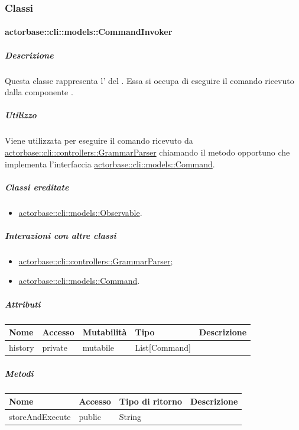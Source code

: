 \documentclass{scalatekids-article}
\begin{document}
\subsubsection{Classi}

\paragraph{actorbase::cli::models::CommandInvoker}
\label{sec:actorbase::cli::models::CommandInvoker}

\subparagraph{Descrizione}

Questa classe rappresenta l' del . Essa
si occupa di eseguire il comando ricevuto dalla componente .

\subparagraph{Utilizzo}

Viene utilizzata per eseguire il comando ricevuto da
\hyperref[sec:actorbase::cli::controllers::GrammarParser]{actorbase::cli::controllers::GrammarParser} chiamando il metodo opportuno che
implementa l'interfaccia \hyperref[sec:actorbase::cli::models::Command]{actorbase::cli::models::Command}.

\subparagraph{Classi ereditate}

\begin{itemize}
\item \hyperref[sec:actorbase::cli::models::Observable]{actorbase::cli::models::Observable}.
\end{itemize}

\subparagraph{Interazioni con altre classi}

\begin{itemize}
\item \hyperref[sec:actorbase::cli::controllers::GrammarParser]{actorbase::cli::controllers::GrammarParser};
\item \hyperref[sec:actorbase::cli::models::Command]{actorbase::cli::models::Command}.
\end{itemize}

\subparagraph{Attributi}

\begin{tabular}{| l | l | l | l | l |}
	\hline
	Nome & Accesso & Mutabilità & Tipo & Descrizione\\
	\hline
	history & private & mutabile & List[Command] & \\
	\hline
\end{tabular}

\subparagraph{Metodi}

\begin{tabular}{| l | l | l | l |}
	\hline
	Nome & Accesso & Tipo di ritorno & Descrizione\\
	\hline
	storeAndExecute & public & String & \\
	\hline
\end{tabular}
\end{document}
